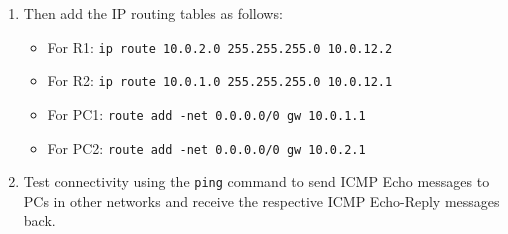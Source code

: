 \documentclass[pdftex,12pt,a4paper]{article}
\begin{document}
\begin{enumerate}
\begin{itemize}
\begin{itemize}
                            \item GigabitEthernet 0/0: IPv4 address 10.0.12.1,
                                subnet mask 255.255.255.0.
                            \item GigabitEthernet 0/1: IPv4 address 10.0.1.1,
                                subnet mask 255.255.255.0.
                        \end{itemize}
                    \item Configure \texttt{R2}'s interfaces as follows:
                        \begin{itemize}
                            \item GigabitEthernet 0/0: IPv4 address 10.0.12.2,
                                subnet mask 255.255.255.0.
                            \item GigabitEthernet 0/1: IPv4 address 10.0.2.1,
                                subnet mask 255.255.255.0.
                        \end{itemize}
                    \item Configure\footnote{\texttt{ifconfig eth0 10.0.1.2/24}}
                        \texttt{\texttt{PC1}}'s interfaces as follows:
                        \begin{itemize}
                            \item eth0: IPv4 address 10.0.1.2,
                                subnet mask 255.255.255.0.
                        \end{itemize}
                    \item Configure \texttt{\texttt{PC2}}'s interfaces as follows:
                        \begin{itemize}
                            \item eth0: IPv4 address 10.0.2.2,
                                subnet mask 255.255.255.0.
                        \end{itemize}
                \end{itemize}
                
            \item Then add the IP routing tables as follows:
                \begin{itemize}
                    \item For R1: \texttt{ip route 10.0.2.0 255.255.255.0
                        10.0.12.2}
                    \item For R2: \texttt{ip route 10.0.1.0 255.255.255.0
                        10.0.12.1}
                    \item For PC1: \texttt{route add -net 0.0.0.0/0 gw
                        10.0.1.1}
                    \item For PC2: \texttt{route add -net 0.0.0.0/0 gw
                                10.0.2.1}
                \end{itemize}
            \item Test connectivity using the \texttt{ping} command to send
                ICMP Echo messages to PCs in other networks and receive the
                respective ICMP Echo-Reply messages back.
        \end{enumerate}
\end{document}
